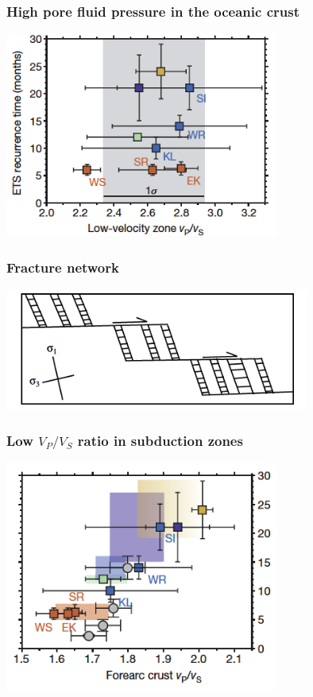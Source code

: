 \documentclass{beamer}
\begin{document}
	\begin{frame}
		\frametitle{High pore fluid pressure in the oceanic crust}
		\begin{center}
			\includegraphics[trim={0cm 0cm 0cm 0cm}, clip, width=9cm]{articles/audet_burgmann_2014_1b.png}
		\end{center}
	\end{frame}

	\begin{frame}
		\frametitle{Fracture network}
		\begin{center}
			\includegraphics[trim={0cm 0cm 0cm 0cm}, clip, width=10cm]{articles/fagereng_harris_2014_8b.png}
		\end{center}
	\end{frame}

	\begin{frame}
		\frametitle{Low $V_P / V_S$ ratio in subduction zones}
		\begin{center}
			\includegraphics[trim={0cm 0cm 0cm 0cm}, clip, width=9cm]{articles/audet_burgmann_2014_1c.png}
		\end{center}
	\end{frame}
\end{document}
